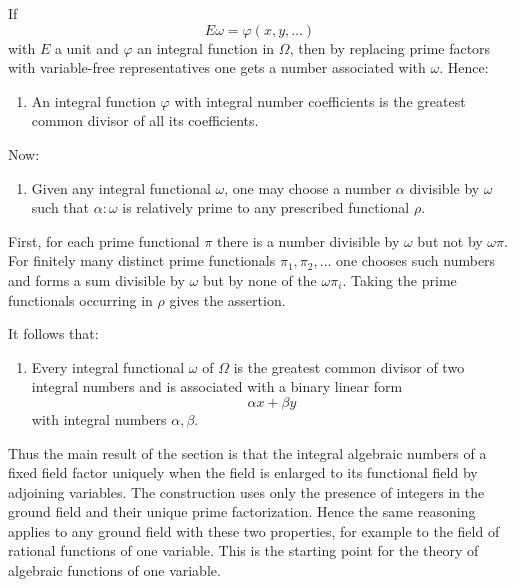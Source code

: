 \documentclass[11pt]{article}
\begin{document}
If
\[
E\omega=\varphi(x,y,\ldots)
\tag{1}
\]
with \(E\) a unit and \(\varphi\) an integral function in \(\Omega\),
then by replacing prime factors with variable-free representatives one
gets a number associated with \(\omega\). Hence:
\begin{enumerate}[label=\arabic*,resume]
\item An integral function \(\varphi\) with integral number
coefficients is the greatest common divisor of all its coefficients.
\end{enumerate}

Now:
\begin{enumerate}[label=\arabic*,resume]
\item Given any integral functional \(\omega\), one may choose a number
\(\alpha\) divisible by \(\omega\) such that \(\alpha:\omega\) is
relatively prime to any prescribed functional \(\rho\).
\end{enumerate}
First, for each prime functional \(\pi\) there is a number divisible
by \(\omega\) but not by \(\omega\pi\). For finitely many distinct
prime functionals \(\pi_1,\pi_2,\ldots\) one chooses such numbers and
forms a sum divisible by \(\omega\) but by none of the
\(\omega\pi_i\). Taking the prime functionals occurring in \(\rho\)
gives the assertion.

It follows that:
\begin{enumerate}[label=\arabic*,resume]
\item Every integral functional \(\omega\) of \(\Omega\) is the
greatest common divisor of two integral numbers and is associated with
a binary linear form
\[
\alpha x+\beta y
\]
with integral numbers \(\alpha,\beta\).
\end{enumerate}

Thus the main result of the section is that the integral algebraic
numbers of a fixed field factor uniquely when the field is enlarged to
its functional field by adjoining variables. The construction uses
only the presence of integers in the ground field and their unique
prime factorization. Hence the same reasoning applies to any ground
field with these two properties, for example to the field of rational
functions of one variable. This is the starting point for the theory
of algebraic functions of one variable.
\end{document}
